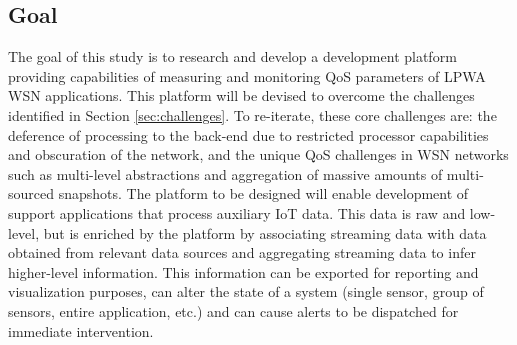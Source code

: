 \subsection{Goal}
\label{sec:goal}
The goal of this study is to research and develop a development platform providing capabilities of measuring and monitoring QoS parameters of LPWA WSN applications. This platform will be devised to overcome the challenges identified in Section \ref{sec:challenges}. To re-iterate, these core challenges are: the deference of processing to the back-end due to restricted processor capabilities and obscuration of the network, and the unique QoS challenges in WSN networks such as multi-level abstractions and aggregation of massive amounts of multi-sourced snapshots. The platform to be designed will enable development of support applications that process auxiliary IoT data. This data is raw and low-level, but is enriched by the platform by associating streaming data with data obtained from relevant data sources and aggregating streaming data to infer higher-level information. This information can be exported for reporting and visualization purposes, can alter the state of a system (single sensor, group of sensors, entire application, etc.) and can cause alerts to be dispatched for immediate intervention.

